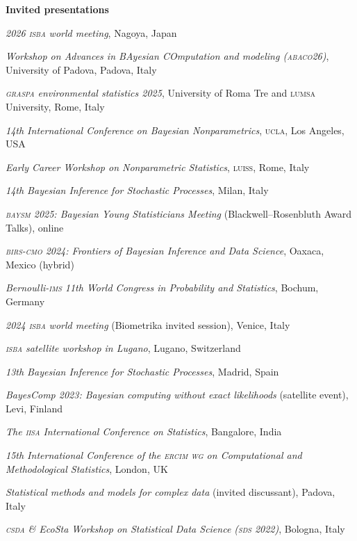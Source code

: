 \documentclass[a4paper,10pt]{article}
\newcommand{\headingfamily}{}
\newlength{\hanggap}\setlength{\hanggap}{0.75em}
\newif\ifcvfresh\cvfreshfalse
\newcommand{\subhead}[1]{%
  \ifcvfresh\cvfreshfalse\else\par\addvspace{0.4\baselineskip}\fi
  {\headingfamily\bfseries\textcolor{accent}{#1}}\nobreak\par
  \addvspace{0.15\baselineskip}\nobreak}
\newcommand{\yr}[1]{\llap{\textcolor{soft}{\footnotesize\bfseries #1}\hspace{\hanggap}}}
\begin{document}
\subhead{Invited presentations}
\begin{dated}
\item[\yr{2026}] \textsl{2026 \textsc{isba} world meeting}, Nagoya, Japan
\item[\yr{2026}] \textsl{Workshop on Advances in BAyesian COmputation and modeling (\textsc{abaco26})}, University of Padova, Padova, Italy
\item[\yr{2025}] \textsl{\textsc{graspa} environmental statistics 2025}, University of Roma Tre and \textsc{lumsa} University, Rome, Italy
\item[\yr{2025}] \textsl{14th International Conference on Bayesian Nonparametrics}, \textsc{ucla}, Los Angeles, USA
\item[\yr{2025}] \textsl{Early Career Workshop on Nonparametric Statistics}, \textsc{luiss}, Rome, Italy
\item[\yr{2025}] \textsl{14th Bayesian Inference for Stochastic Processes}, Milan, Italy
\item[\yr{2025}] \textsl{\textsc{baysm} 2025: Bayesian Young Statisticians Meeting} (Blackwell--Rosenbluth Award Talks), online
\item[\yr{2024}] \textsl{\textsc{birs-cmo} 2024: Frontiers of Bayesian Inference and Data Science}, Oaxaca, Mexico (hybrid)
\item[\yr{2024}] \textsl{Bernoulli-\textsc{ims} 11th World Congress in Probability and Statistics}, Bochum, Germany
\item[\yr{2024}] \textsl{2024 \textsc{isba} world meeting} (Biometrika invited session), Venice, Italy
\item[\yr{2024}] \textsl{\textsc{isba} satellite workshop in Lugano}, Lugano, Switzerland
\item[\yr{2023}] \textsl{13th Bayesian Inference for Stochastic Processes}, Madrid, Spain
\item[\yr{2023}] \textsl{BayesComp 2023: Bayesian computing without exact likelihoods} (satellite event), Levi, Finland
\item[\yr{2022}] \textsl{The \textsc{iisa} International Conference on Statistics}, Bangalore, India
\item[\yr{2022}] \textsl{15th International Conference of the \textsc{ercim wg} on Computational and Methodological Statistics}, London, UK
\item[\yr{2022}] \textsl{Statistical methods and models for complex data} (invited discussant), Padova, Italy
\item[\yr{2022}] \textsl{\textsc{csda} \& EcoSta Workshop on Statistical Data Science (\textsc{sds} 2022)}, Bologna, Italy

\end{dated}
\end{document}
